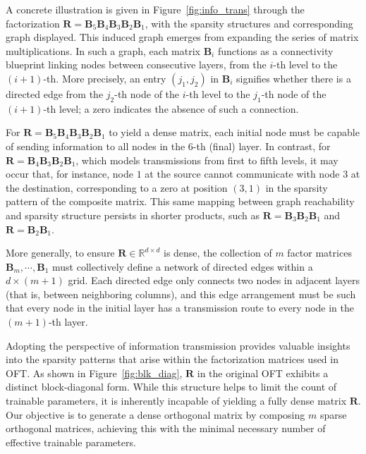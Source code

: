 A concrete illustration is given in Figure~\ref{fig:info_trans} through the factorization $\bm{R}=\bm{B}_5\bm{B}_4\bm{B}_3\bm{B}_2\bm{B}_1$, with the sparsity structures and corresponding graph displayed. This induced graph emerges from expanding the series of matrix multiplications. In such a graph, each matrix $\bm{B}_i$ functions as a connectivity blueprint linking nodes between consecutive layers, from the $i$-th level to the $(i+1)$-th. More precisely, an entry $(j_1, j_2)$ in $\bm{B}_i$ signifies whether there is a directed edge from the $j_2$-th node of the $i$-th level to the $j_1$-th node of the $(i+1)$-th level; a zero indicates the absence of such a connection. 

For $\bm{R}=\bm{B}_5\bm{B}_4\bm{B}_3\bm{B}_2\bm{B}_1$ to yield a dense matrix, each initial node must be capable of sending information to all nodes in the $6$-th (final) layer. In contrast, for $\bm{R}=\bm{B}_4\bm{B}_3\bm{B}_2\bm{B}_1$, which models transmissions from first to fifth levels, it may occur that, for instance, node $1$ at the source cannot communicate with node $3$ at the destination, corresponding to a zero at position $(3,1)$ in the sparsity pattern of the composite matrix. This same mapping between graph reachability and sparsity structure persists in shorter products, such as $\bm{R}=\bm{B}_3\bm{B}_2\bm{B}_1$ and $\bm{R}=\bm{B}_2\bm{B}_1$. 

More generally, to ensure $\bm{R}\in\mathbb{R}^{d\times d}$ is dense, the collection of $m$ factor matrices $\bm{B}_m,\cdots,\bm{B}_1$ must collectively define a network of directed edges within a $d\times (m+1)$ grid. Each directed edge only connects two nodes in adjacent layers (that is, between neighboring columns), and this edge arrangement must be such that every node in the initial layer has a transmission route to every node in the $(m+1)$-th layer.

Adopting the perspective of information transmission provides valuable insights into the sparsity patterns that arise within the factorization matrices used in OFT. As shown in Figure~\ref{fig:blk_diag}, $\bm{R}$ in the original OFT exhibits a distinct block-diagonal form. While this structure helps to limit the count of trainable parameters, it is inherently incapable of yielding a fully dense matrix $\bm{R}$. Our objective is to generate a dense orthogonal matrix by composing $m$ sparse orthogonal matrices, achieving this with the minimal necessary number of effective trainable parameters.

